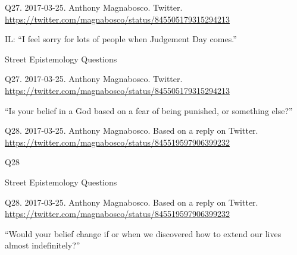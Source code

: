 \documentclass[
    src/templates/5x2-on-a4paper,
    frame
]{flashcards}
\newcommand{\myheader}{}
\newcommand{\myfooter}{
    \begin{flushright}
        \small\sc
        Street Epistemology Questions \par
    \end{flushright}
}
\begin{document}
        \renewcommand{\myheader}{
            \normalfont %
            \begin{tiny}
                Q27.
                2017-03-25.
                Anthony Magnabosco.
                    Twitter.
                    \\
                    \url{ https://twitter.com/magnabosco/status/845505179315294213 }
                \par
            \end{tiny}
        }
        \begin{flashcard}{
            \myheader
            \vspace{\fill}
            \begin{center}
                \large
                    IL: \enquote{I feel sorry for lots of people when Judgement Day comes.}            \end{center}
            \vspace{\fill}
            \myfooter
            \vspace{-1.4ex}
        }
            \myheader
            \vspace{\fill}
            \begin{center}
                \large
\enquote{Is your belief in a God based on a fear of being punished, or something else?}            \end{center}
            \vspace{\fill}
        \end{flashcard}
        \renewcommand{\myheader}{
            \normalfont %
            \begin{tiny}
                Q28.
                2017-03-25.
                Anthony Magnabosco.
                    Based on a reply on Twitter.
                    \\
                    \url{ https://twitter.com/magnabosco/status/845519597906399232 }
                \par
            \end{tiny}
        }
        \begin{flashcard}{
            \myheader
            \vspace{\fill}
            \begin{center}
                \large
                    Q28
            \end{center}
            \vspace{\fill}
            \myfooter
            \vspace{-1.4ex}
        }
            \myheader
            \vspace{\fill}
            \begin{center}
                \large
\enquote{Would your belief change if or when we discovered how to extend our lives almost indefinitely?}            \end{center}
            \vspace{\fill}
        \end{flashcard}
\end{document}
